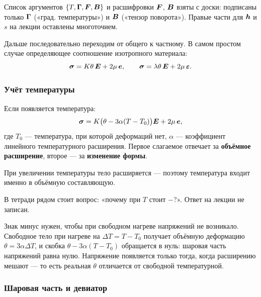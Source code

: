 \begin{warn}
Список аргументов $\{T,\boldsymbol{\Gamma},\boldsymbol{F},\boldsymbol{B}\}$ и расшифровки $\boldsymbol{F}$, $\boldsymbol{B}$
взяты с доски: подписаны только $\boldsymbol{\Gamma}$ («град. температуры») и $\boldsymbol{B}$
(«тензор поворота»). Правые части для $\boldsymbol{h}$ и $s$ на лекции оставлены
многоточием.
\end{warn}

Дальше последовательно переходим от общего к частному. В самом простом случае
определяющее соотношение изотропного материала:
\begin{equation}\label{eq:hooke-K}
  \boldsymbol{\sigma} = K\theta\,\boldsymbol{E} + 2\mu\,\boldsymbol{e} ,
  \qquad
  \boldsymbol{\sigma} = \lambda\theta\,\boldsymbol{E} + 2\mu\,\boldsymbol{\varepsilon} .
\end{equation}

\subsubsection*{Учёт температуры}

Если появляется температура:
\begin{equation}\label{eq:hooke-temp}
  \boldsymbol{\sigma} = K\bigl(\theta - 3\alpha(T - T_0)\bigr)\boldsymbol{E} + 2\mu\,\boldsymbol{e} ,
\end{equation}
где $T_0$ — температура, при которой деформаций нет, $\alpha$ — коэффициент
линейного температурного расширения. Первое слагаемое отвечает за
\textbf{объёмное расширение}, второе — за \textbf{изменение формы}.

При увеличении температуры тело расширяется — поэтому температура входит именно
в объёмную составляющую.

\begin{warn}
В тетради рядом стоит вопрос: «почему при $T$ стоит $-$?». Ответ на лекции не
записан.
\end{warn}

\begin{idea}
Знак минус нужен, чтобы при свободном нагреве напряжений не возникало. Свободное
тело при нагреве на $\Delta T = T - T_0$ получает объёмную деформацию
$\theta = 3\alpha\Delta T$, и скобка $\theta - 3\alpha(T-T_0)$ обращается в нуль:
шаровая часть напряжений равна нулю. Напряжение появляется только тогда, когда
расширению мешают — то есть реальная $\theta$ отличается от свободной
температурной.
\end{idea}

\subsubsection*{Шаровая часть и девиатор}

